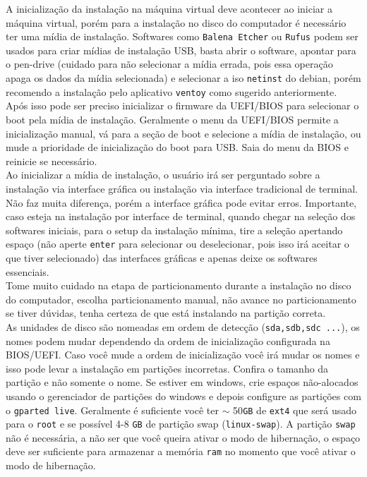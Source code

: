 \documentclass[12pt,a4paper]{article}
\begin{document}
\vspace{\baselineskip}

A inicialização da instalação na máquina virtual deve acontecer ao iniciar a máquina virtual, porém para a instalação no disco do computador é necessário ter uma mídia de instalação. Softwares como \texttt{Balena Etcher} ou \texttt{Rufus} podem ser usados para criar mídias de instalação USB, basta abrir o software, apontar para o pen-drive (cuidado para não selecionar a mídia errada, pois essa operação apaga os dados da mídia selecionada) e selecionar a iso \texttt{netinst} do debian, porém recomendo a instalação pelo aplicativo \texttt{ventoy} como sugerido anteriormente. Após isso pode ser preciso inicializar o firmware da UEFI/BIOS para selecionar o boot pela mídia de instalação. Geralmente o menu da UEFI/BIOS permite a inicialização manual, vá para a seção de boot e selecione a mídia de instalação, ou mude a prioridade de inicialização do boot para USB. Saia do menu da BIOS e reinicie se necessário. \\ 

Ao inicializar a mídia de instalação, o usuário irá ser perguntado sobre a instalação via interface gráfica ou instalação via interface tradicional de terminal. Não faz muita diferença, porém a interface gráfica pode evitar erros. Importante, caso esteja na instalação por interface de terminal, quando chegar na seleção dos softwares iniciais, para o setup da instalação mínima, tire a seleção apertando espaço (não aperte \texttt{enter} para selecionar ou deselecionar, pois isso irá aceitar o que tiver selecionado) das interfaces gráficas e apenas deixe os softwares essenciais. \\

Tome muito cuidado na etapa de particionamento durante a instalação no disco do computador, escolha particionamento manual, não avance no particionamento se tiver dúvidas, tenha certeza de que está instalando na partição correta. \\

As unidades de disco são nomeadas em ordem de detecção (\texttt{sda,sdb,sdc ...}), os nomes podem mudar dependendo da ordem de inicialização configurada na BIOS/UEFI. Caso você mude a ordem de inicialização você irá mudar os nomes e isso pode levar a instalação em partições incorretas. Confira o tamanho da partição e não somente o nome. Se estiver em windows, crie espaços não-alocados usando o gerenciador de partições do windows e depois configure as partições com o \texttt{gparted live}. Geralmente é suficiente você ter $\sim$ 50\texttt{GB} de \texttt{ext4} que será usado para o \texttt{root} e se possível 4-8 \texttt{GB} de partição swap (\texttt{linux-swap}). A partição \texttt{swap} não é necessária, a não ser que você queira ativar o modo de hibernação, o espaço deve ser suficiente para armazenar a memória \texttt{ram} no momento que você ativar o modo de hibernação. \\
\end{document}
